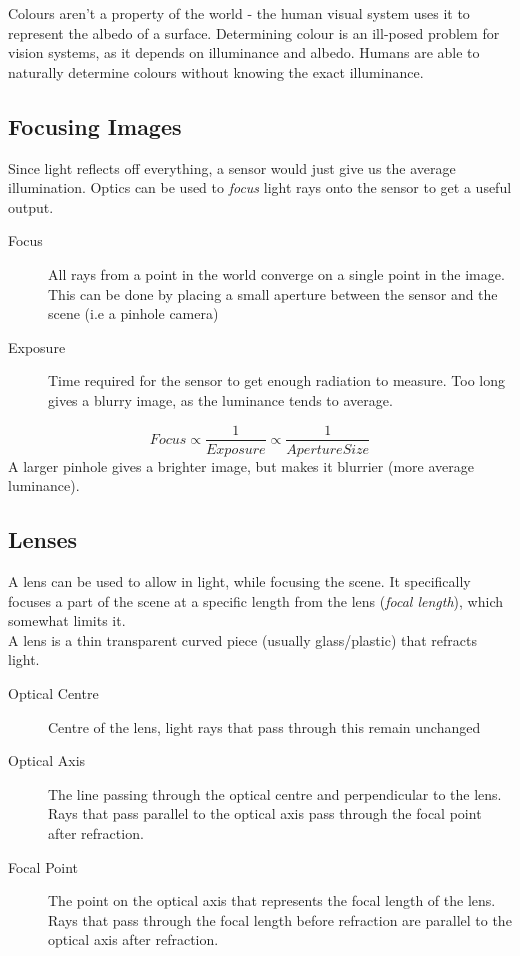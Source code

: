 Colours aren't a property of the world - the human visual system uses it to represent the albedo of a surface. Determining colour is an ill-posed problem for vision systems, as it depends on illuminance and albedo. Humans are able to naturally determine colours without knowing the exact illuminance.  


\subsection{Focusing Images}
Since light reflects off everything, a sensor would just give us the average illumination. Optics can be used to \emph{focus} light rays onto the sensor to get a useful output.
\begin{description}
    \item[Focus] All rays from a point in the world converge on a single point in the image. This can be done by placing a small aperture between the sensor and the scene (i.e a pinhole camera)
    \item[Exposure] Time required for the sensor to get enough radiation to measure. Too long gives a blurry image, as the luminance tends to average.
\end{description}
\[
Focus \propto \frac{1}{Exposure} \propto \frac{1}{Aperture Size}
\]
A larger pinhole gives a brighter image, but makes it blurrier (more average luminance).

\subsection{Lenses}
A lens can be used to allow in light, while focusing the scene. It specifically focuses a part of the scene at a specific length from the lens (\emph{focal length}), which somewhat limits it. \\
A lens is a thin transparent curved piece (usually glass/plastic) that refracts light. 
\begin{description}
    \item[Optical Centre] Centre of the lens, light rays that pass through this remain unchanged
    \item[Optical Axis] The line passing through the optical centre and perpendicular to the lens. \\ \quad \quad Rays that pass parallel to the optical axis pass through the focal point after refraction.
    \item[Focal Point] The point on the optical axis that represents the focal length of the lens. \\ \quad \quad Rays that pass through the focal length before refraction are parallel to the optical axis after refraction.
\end{description}

